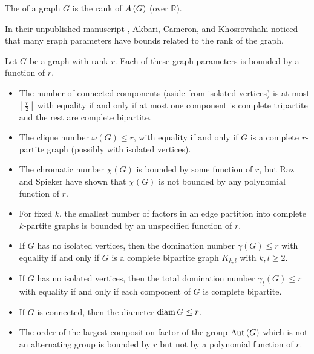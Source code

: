 \begin{definition}
	The  of a graph $G$ is the rank of $A\left(G\right)$ (over $\mathbb{R}$).
\end{definition}

In their unpublished manuscript \cite{ACK}, Akbari, Cameron, and Khosrovshahi noticed that many graph parameters have bounds related to the rank of the graph.

\begin{proposition} Let $G$ be a graph with rank $r$. Each of these graph parameters is bounded by a function of $r$.
	\begin{itemize}
		\item The number of connected components (aside from isolated vertices) is at most $\left\lfloor\frac{r}{2}\right\rfloor$ with equality if and only if at most one component is complete tripartite and the rest are complete bipartite.
		\item The clique number $\omega\left(G\right) \leq r$, with equality if and only if $G$ is a complete $r$-partite graph (possibly with isolated vertices).
		\item The chromatic number $\chi\left(G\right)$ is bounded by some function of $r$, but Raz and Spieker \cite{RazSpi} have shown that $\chi\left(G\right)$ is not bounded by any polynomial function of $r$.
		\item For fixed $k$, the smallest number of factors in an edge partition into complete $k$-partite graphs is bounded by an unspecified function of $r$.%
		\item If $G$ has no isolated vertices, then the domination number $\gamma\left(G\right) \leq r$ with equality if and only if $G$ is a complete bipartite graph $K_{k,l}$ with $k,l \geq 2$.
		\item If $G$ has no isolated vertices, then the total domination number $\gamma_{t}\left(G\right) \leq r$ with equality if and only if each component of $G$ is complete bipartite.
		\item If $G$ is connected, then the diameter $\operatorname{diam} G \leq r$.
		\item The order of the largest composition factor of the group $\operatorname{Aut}\left(G\right)$ which is not an alternating group is bounded by $r$ but not by a polynomial function of $r$.
	\end{itemize}
\end{proposition}

